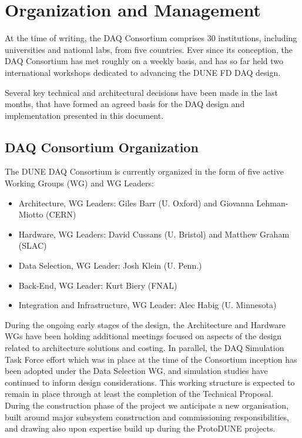 
\section{Organization and Management}
\label{sec:fd-daq-org}

At the time of writing, the DAQ Consortium comprises 30 institutions, including universities and national labs, from five countries. Ever since its conception, the DAQ Consortium has met roughly on a weekly basis, and has so far held two international workshops dedicated to advancing the DUNE FD DAQ design.

Several key technical and architectural decisions have been made in the last months, that have formed an agreed basis for the DAQ design and implementation presented in this document.

\subsection{DAQ Consortium Organization}
\label{sec:fd-daq-org-consortium}

The DUNE DAQ Consortium is currently organized in the form of five active
Working Groups (WG) and WG Leaders:
\begin{itemize}
\item Architecture, WG Leaders: Giles Barr (U. Oxford) and Giovanna Lehman-Miotto (CERN)
\item Hardware, WG Leaders: David Cussans (U. Bristol) and Matthew Graham (SLAC)
\item Data Selection, WG Leader: Josh Klein (U. Penn.)
\item Back-End, WG Leader: Kurt Biery (FNAL)
\item Integration and Infrastructure, WG Leader: Alec Habig (U. Minnesota)
\end{itemize}

During the ongoing early stages of the design, the Architecture and Hardware WGs have been holding additional meetings focused on aspects of the design related to architecture solutions and costing. In parallel, the DAQ Simulation Task Force effort which was in place at the time of the Consortium inception has been adopted under the Data Selection WG, and simulation studies have continued to inform design considerations. This working structure is expected to remain in place through at least the completion of the Technical Proposal. During the construction phase of the project we anticipate a new organisation, built around major subsystem construction and commissioning responsibilities, and drawing also upon expertise build up during the ProtoDUNE projects.

